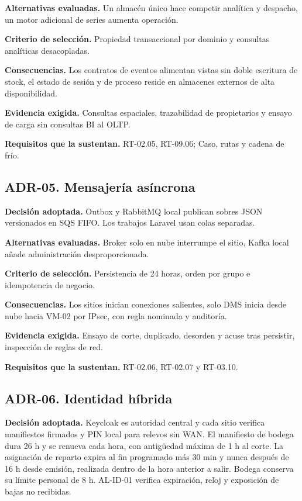\textbf{Alternativas evaluadas.} Un almacén único hace competir analítica y despacho, un motor adicional de series aumenta operación.

\textbf{Criterio de selección.} Propiedad transaccional por dominio y consultas analíticas desacopladas.

\textbf{Consecuencias.} Los contratos de eventos alimentan vistas sin doble escritura de stock, el estado de sesión y de proceso reside en almacenes externos de alta disponibilidad.

\textbf{Evidencia exigida.} Consultas espaciales, trazabilidad de propietarios y ensayo de carga sin consultas BI al OLTP.

\textbf{Requisitos que la sustentan.} RT-02.05, RT-09.06; Caso, rutas y cadena de frío.

\subsection*{ADR-05. Mensajería asíncrona}
\label{sub:adr-05}
\textbf{Decisión adoptada.} Outbox y RabbitMQ local publican sobres JSON versionados en SQS FIFO. Los trabajos Laravel usan colas separadas.

\textbf{Alternativas evaluadas.} Broker solo en nube interrumpe el sitio, Kafka local añade administración desproporcionada.

\textbf{Criterio de selección.} Persistencia de 24 horas, orden por grupo e idempotencia de negocio.

\textbf{Consecuencias.} Los sitios inician conexiones salientes, solo DMS inicia desde nube hacia VM-02 por IPsec, con regla nominada y auditoría.

\textbf{Evidencia exigida.} Ensayo de corte, duplicado, desorden y acuse tras persistir, inspección de reglas de red.

\textbf{Requisitos que la sustentan.} RT-02.06, RT-02.07 y RT-03.10.

\subsection*{ADR-06. Identidad híbrida}
\label{sub:adr-06}
\textbf{Decisión adoptada.} Keycloak es autoridad central y cada sitio verifica manifiestos firmados y PIN local para relevos sin WAN. El manifiesto de bodega dura 26 h y se renueva cada hora, con antigüedad máxima de 1 h al corte. La asignación de reparto expira al fin programado más 30 min y nunca después de 16 h desde emisión, realizada dentro de la hora anterior a salir. Bodega conserva su límite personal de 8 h. AL-ID-01 verifica expiración, reloj y exposición de bajas no recibidas.

